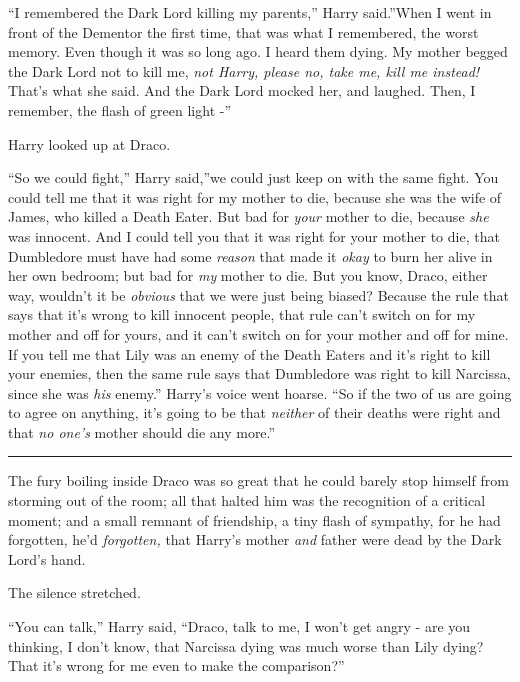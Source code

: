 ``I remembered the Dark Lord killing my parents,'' Harry said.''When I
went in front of the Dementor the first time, that was what I
remembered, the worst memory. Even though it was so long ago. I heard
them dying. My mother begged the Dark Lord not to kill me, \emph{not
Harry, please no, take me, kill me instead!} That's what she said. And
the Dark Lord mocked her, and laughed. Then, I remember, the flash of
green light -''

Harry looked up at Draco.

``So we could fight,'' Harry said,''we could just keep on with the same
fight. You could tell me that it was right for my mother to die, because
she was the wife of James, who killed a Death Eater. But bad for
\emph{your} mother to die, because \emph{she} was innocent. And I could
tell you that it was right for your mother to die, that Dumbledore must
have had some \emph{reason} that made it \emph{okay} to burn her alive
in her own bedroom; but bad for \emph{my} mother to die. But you know,
Draco, either way, wouldn't it be \emph{obvious} that we were just being
biased? Because the rule that says that it's wrong to kill innocent
people, that rule can't switch on for my mother and off for yours, and
it can't switch on for your mother and off for mine. If you tell me that
Lily was an enemy of the Death Eaters and it's right to kill your
enemies, then the same rule says that Dumbledore was right to kill
Narcissa, since she was \emph{his} enemy.'' Harry's voice went hoarse.
``So if the two of us are going to agree on anything, it's going to be
that \emph{neither} of their deaths were right and that \emph{no one's}
mother should die any more.''

\begin{center}\rule{3in}{0.4pt}\end{center}

The fury boiling inside Draco was so great that he could barely stop
himself from storming out of the room; all that halted him was the
recognition of a critical moment; and a small remnant of friendship, a
tiny flash of sympathy, for he had forgotten, he'd \emph{forgotten,}
that Harry's mother \emph{and} father were dead by the Dark Lord's hand.

The silence stretched.

``You can talk,'' Harry said, ``Draco, talk to me, I won't get angry -
are you thinking, I don't know, that Narcissa dying was much worse than
Lily dying? That it's wrong for me even to make the comparison?''


